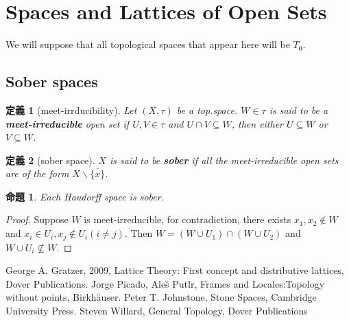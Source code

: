 \documentclass[a4j,12pt]{jarticle}
\numberwithin{equation}{section}
\newcommand{\itbf}[1]{\textit{\textbf{#1}}}
\newtheorem{dfn}{定義}[section]
\newtheorem{prop}[thm]{命題}
\begin{document}
\section{Spaces and Lattices of Open Sets}
We will suppose that all topological spaces that appear here will be $T_0$.
\subsection{Sober spaces}
\begin{dfn}[meet-irrducibility]
  Let $(X,\tau)$ be a top.space. $W\in \tau$ is said to be a \itbf{meet-irreducible} open set if $U,V\in \tau$ and $U \cap V \subseteq W$, then either $U \subseteq W$ or $V \subseteq W$.
\end{dfn}
\begin{dfn}[sober space]
  $X$ is said to be \itbf{sober} if all the meet-irreducible open sets are of the form $X\backslash \overline{\{x\}}$.
\end{dfn}
\begin{prop}
  Each Haudorff space is sober.
\end{prop}
\begin{proof}
  Suppose $W$ is meet-irreducible, for contradiction, there exists $x_1,x_2\notin W$ and $x_i \in U_i, x_j \notin U_i(i \ne j)$.
  Then $W = (W \cup U_1) \cap (W \cup U_2)$ and $W\cup U_i \nsubseteq W$.
\end{proof}

\begin{thebibliography}{10}
  George A. Gratzer, 2009, Lattice Theory: First concept and distributive lattices, Dover Publications.
  Jorge Picado, Ale\u{s} Putlr, Frames and Locales:Topology without points, Birkh\"auser.
  Peter T. Johnstone, Stone Spaces, Cambridge University Press.
  Steven Willard, General Topology, Dover Publications
\end{thebibliography}
\end{document}
